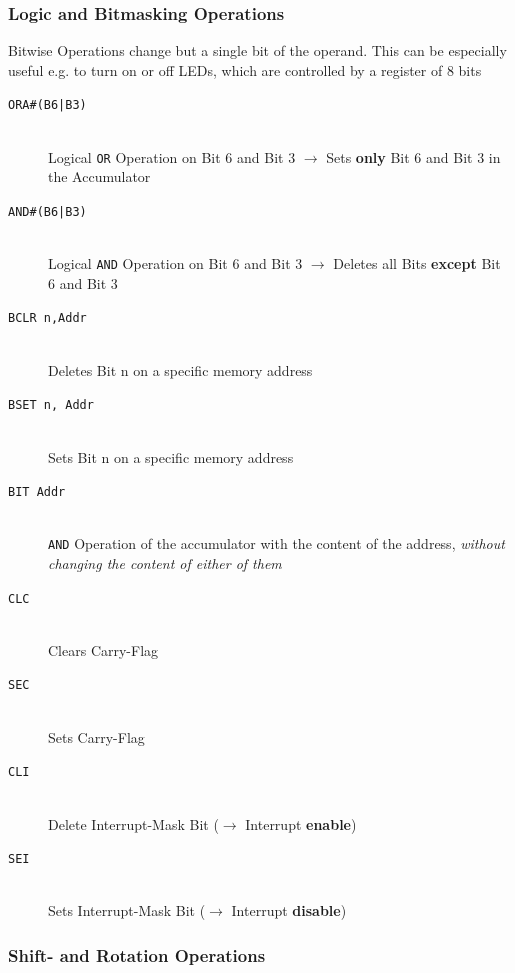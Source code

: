 \documentclass[a4paper, 11pt, nofootinbib]{book}
\newcommand{\code}[1]{\texttt{#1}}
\begin{document}
\subsubsection{Logic and Bitmasking Operations}
Bitwise Operations change but a single bit of the operand. This can be especially useful e.g. to turn on or off LEDs, which are controlled by a register of 8 bits

\begin{description}
	\item[\code{ORA\#(B6|B3)}] \mbox{} \\
	Logical \code{OR} Operation on Bit 6 and Bit 3 $\rightarrow$ Sets \textbf{only} Bit 6 and Bit 3 in the Accumulator
	\item[\code{AND\#(B6|B3)}]\mbox{}\\
	Logical \code{AND} Operation on Bit 6 and Bit 3 $\rightarrow$ Deletes all Bits \textbf{except} Bit 6 and Bit 3
	\item[\code{BCLR n,Addr}] \mbox{}\\
	Deletes Bit n on a specific memory address
	\item[\code{BSET n, Addr}]\mbox{}\\
	Sets Bit n on a specific memory address
	\item[\code{BIT Addr}] \mbox{}\\
	\code{AND} Operation of the accumulator with the content of the address, \textit{without changing the content of either of them}
	\item[\code{CLC}] \mbox{}\\
	Clears Carry-Flag
	\item[\code{SEC}] \mbox{}\\
	Sets Carry-Flag
	\item[\code{CLI}] \mbox{}\\
	Delete Interrupt-Mask Bit ($\rightarrow$ Interrupt \textbf{enable})
	\item[\code{SEI}] \mbox{}\\
	Sets Interrupt-Mask Bit ($\rightarrow$ Interrupt \textbf{disable})
\end{description}

\newpage

\subsubsection{Shift- and Rotation Operations}
\end{document}
